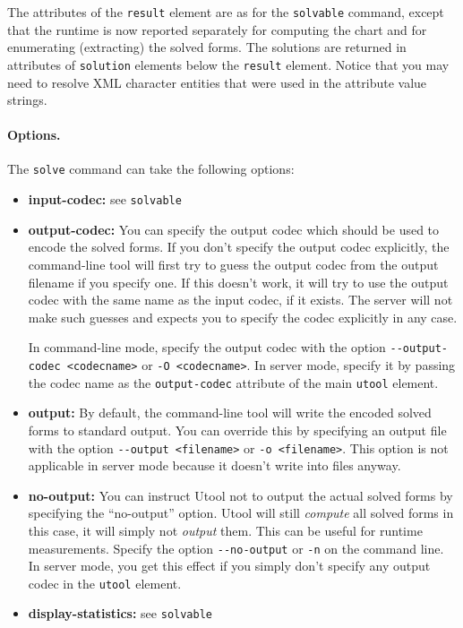 The attributes of the \verb?result? element are as for the
\verb?solvable? command, except that the runtime is now reported
separately for computing the chart and for enumerating (extracting)
the solved forms. The solutions are returned in attributes of
\verb?solution? elements below the \verb?result? element. Notice that
you may need to resolve XML character entities that were used in the
attribute value strings.

\paragraph{Options.}
The \verb?solve? command can take the following options:
\begin{itemize}
\item \textbf{input-codec:} see \verb?solvable?
\item \textbf{output-codec:} You can specify the output codec which
should be used to encode the solved forms. If you don't specify the
output codec explicitly, the command-line tool will first try to guess
the output codec from the output filename if you specify one. If this
doesn't work, it will try to use the output codec with the same name
as the input codec, if it exists. The server will not make such
guesses and expects you to specify the codec explicitly in any case.

In command-line mode, specify the output codec with the option
\verb?--output-codec <codecname>? or \verb?-O <codecname>?. In server
mode, specify it by passing the codec name as the \verb?output-codec?
attribute of the main \verb?utool? element.

\item \textbf{output:} By default, the command-line tool will write
the encoded solved forms to standard output. You can override this by
specifying an output file with the option \verb?--output <filename>?
or \verb?-o <filename>?. This option is not applicable in server mode
because it doesn't write into files anyway.

\item \textbf{no-output:} You can instruct Utool not to output the
actual solved forms by specifying the ``no-output'' option. Utool will
still \emph{compute} all solved forms in this case, it will simply not
\emph{output} them. This can be useful for runtime
measurements. Specify the option \verb?--no-output? or \verb?-n? on
the command line. In server mode, you get this effect if you simply
don't specify any output codec in the \verb?utool? element.

\item \textbf{display-statistics:} see \verb?solvable? 
\end{itemize}






